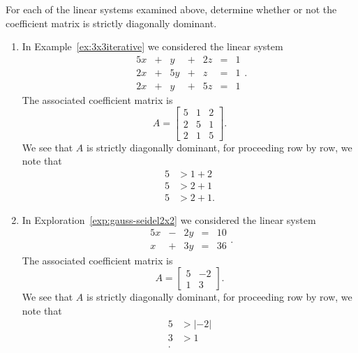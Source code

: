 \documentclass{ximera}
\begin{document}
\begin{example}\label{ex:strict_diag_dom}
For each of the linear systems examined above, determine whether or not the coefficient matrix is strictly diagonally dominant.

\begin{explanation}
\begin{enumerate}
    \item In Example~\ref{ex:3x3iterative} we considered the linear system 
    $$\begin{array}{ccccccc}
      5x & +&y&+&2z&= &1 \\
	 2x& +&5y&+&z&=&1\\
     2x& +&y&+&5z&=&1
    \end{array}.$$
    The associated coefficient matrix is 
    $$A=\left[\begin{array}{ccc}  5&1&2\\2&5&1\\2&1&5
 \end{array}\right].$$
    We see that $A$ is strictly diagonally dominant, for proceeding row by row, we note that
    \begin{align*}
        5 &> 1 + 2 \\
        5 &> 2 + 1 \\
        5 &> 2 + 1 .
    \end{align*}
    
    \item In Exploration~\ref{exp:gauss-seidel2x2} we considered the linear system 
  $$\begin{array}{ccccc}
      5x& -&2y&=&10\\
      x & +&3y&= &36 
    \end{array}.$$
    The associated coefficient matrix is 
    $$A=\left[\begin{array}{cc}  5&-2\\1&3
 \end{array}\right].$$
    We see that $A$ is strictly diagonally dominant, for proceeding row by row, we note that
    \begin{align*}
        5 &> |-2| \\
        3 &>  1 \\ .
    \end{align*}
    

\end{enumerate}
\end{explanation}
\end{example}
\end{document}
